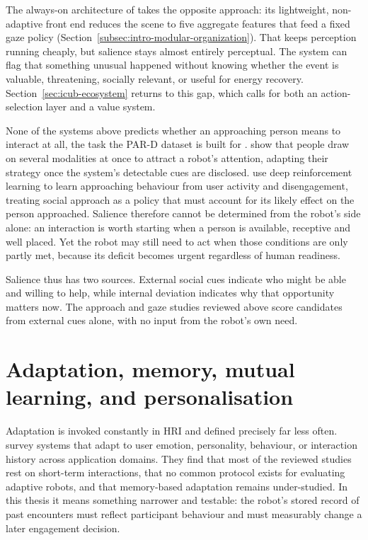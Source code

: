 The always-on architecture of \citet{Pasquali2025AlwaysOn} takes the opposite approach: its lightweight, non-adaptive front end reduces the scene to five aggregate features that feed a fixed gaze policy (Section~\ref{subsec:intro-modular-organization}). That keeps perception running cheaply, but salience stays almost entirely perceptual. The system can flag that something unusual happened without knowing whether the event is valuable, threatening, socially relevant, or useful for energy recovery. Section~\ref{sec:icub-ecosystem} returns to this gap, which calls for both an action-selection layer and a value system.

None of the systems above predicts whether an approaching person means to interact at all, the task the PAR-D dataset is built for \citep{Thompson2024PARD}. \citet{AbadMoya2026Initiation} show that people draw on several modalities at once to attract a robot's attention, adapting their strategy once the system's detectable cues are disclosed. \citet{Raggioli2025ApproachingBehavior} use deep reinforcement learning to learn approaching behaviour from user activity and disengagement, treating social approach as a policy that must account for its likely effect on the person approached. Salience therefore cannot be determined from the robot's side alone: an interaction is worth starting when a person is available, receptive and well placed. Yet the robot may still need to act when those conditions are only partly met, because its deficit becomes urgent regardless of human readiness.

Salience thus has two sources. External social cues indicate who might be able and willing to help, while internal deviation indicates why that opportunity matters now. The approach and gaze studies reviewed above score candidates from external cues alone, with no input from the robot's own need.

\section{Adaptation, memory, mutual learning, and personalisation}
\label{sec:soa-adaptation}

Adaptation is invoked constantly in HRI and defined precisely far less often. \citet{Ahmad2017Adaptivity} survey systems that adapt to user emotion, personality, behaviour, or interaction history across application domains. They find that most of the reviewed studies rest on short-term interactions, that no common protocol exists for evaluating adaptive robots, and that memory-based adaptation remains under-studied. In this thesis it means something narrower and testable: the robot's stored record of past encounters must reflect participant behaviour and must measurably change a later engagement decision.

